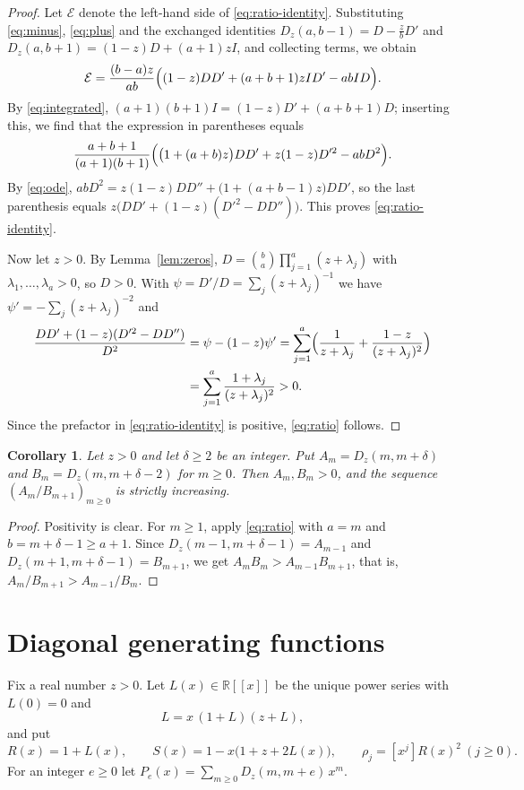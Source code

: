 \documentclass{amsart}
\newtheorem{corollary}[theorem]{Corollary}
\theoremstyle{definition}
\theoremstyle{remark}
\numberwithin{equation}{section}
\numberwithin{table}{section}
\newcommand{\Dz}{D_z}
\newcommand{\coef}[1]{[#1]}
\begin{document}
\begin{proof}
Let $\mathcal{E}$ denote the left-hand side of \eqref{eq:ratio-identity}. Substituting \eqref{eq:minus}, \eqref{eq:plus} and the exchanged identities $\Dz(a,b-1)=D-\frac{z}{b}D'$ and $\Dz(a,b+1)=(1-z)D+(a+1)zI$, and collecting terms, we obtain
\[
\mathcal{E}=\frac{(b-a)z}{ab}\Bigl((1-z)DD'+(a+b+1)zID'-abID\Bigr).
\]
By \eqref{eq:integrated}, $(a+1)(b+1)I=(1-z)D'+(a+b+1)D$; inserting this, we find that the expression in parentheses equals
\[
\frac{a+b+1}{(a+1)(b+1)}\Bigl(\bigl(1+(a+b)z\bigr)DD'+z(1-z)D'^2-abD^2\Bigr).
\]
By \eqref{eq:ode}, $abD^2=z(1-z)DD''+\bigl(1+(a+b-1)z\bigr)DD'$, so the last parenthesis equals $z\bigl(DD'+(1-z)(D'^2-DD'')\bigr)$. This proves \eqref{eq:ratio-identity}.

Now let $z>0$. By Lemma~\ref{lem:zeros}, $D=\binom{b}{a}\prod_{j=1}^{a}(z+\lambda_j)$ with $\lambda_1,\dots,\lambda_a>0$, so $D>0$. With $\psi=D'/D=\sum_j(z+\lambda_j)^{-1}$ we have $\psi'=-\sum_j(z+\lambda_j)^{-2}$ and
\[
\begin{aligned}
\frac{DD'+(1-z)(D'^2-DD'')}{D^2}&=\psi-(1-z)\psi'=\sum_{j=1}^{a}\Bigl(\frac{1}{z+\lambda_j}+\frac{1-z}{(z+\lambda_j)^2}\Bigr)\\
&=\sum_{j=1}^{a}\frac{1+\lambda_j}{(z+\lambda_j)^2}>0.
\end{aligned}
\]
Since the prefactor in \eqref{eq:ratio-identity} is positive, \eqref{eq:ratio} follows.
\end{proof}

\begin{corollary}\label{cor:ratio}
Let $z>0$ and let $\delta\ge 2$ be an integer. Put $A_m=\Dz(m,m+\delta)$ and $B_m=\Dz(m,m+\delta-2)$ for $m\ge 0$. Then $A_m,B_m>0$, and the sequence $(A_m/B_{m+1})_{m\ge 0}$ is strictly increasing.
\end{corollary}

\begin{proof}
Positivity is clear. For $m\ge 1$, apply \eqref{eq:ratio} with $a=m$ and $b=m+\delta-1\ge a+1$. Since $\Dz(m-1,m+\delta-1)=A_{m-1}$ and $\Dz(m+1,m+\delta-1)=B_{m+1}$, we get $A_mB_m>A_{m-1}B_{m+1}$, that is, $A_m/B_{m+1}>A_{m-1}/B_m$.
\end{proof}

\section{Diagonal generating functions}\label{sec:diagonal}

Fix a real number $z>0$. Let $L(x)\in\mathbb{R}[[x]]$ be the unique power series with $L(0)=0$ and
\[
L=x\,(1+L)(z+L),
\]
and put
\[
R(x)=1+L(x),\qquad S(x)=1-x\bigl(1+z+2L(x)\bigr),\qquad \rho_j=\coef{x^j}R(x)^2\ (j\ge 0).
\]
For an integer $e\ge 0$ let $P_e(x)=\sum_{m\ge 0}\Dz(m,m+e)\,x^m$.
\end{document}
